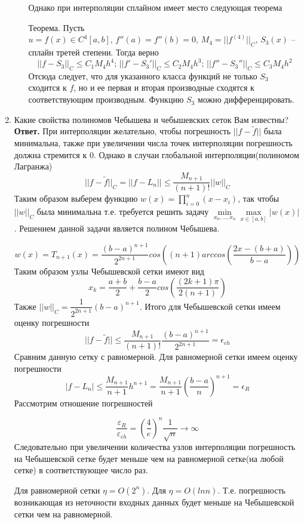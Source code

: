 \documentclass{article}
\begin{document}
\begin{enumerate}
\begin{enumerate}
            
            Однако при интерполяции сплайном имеет место следующая теорема
            
            
            Теорема. Пусть $u=f(x)\in C^4[a,b],\, f''(a)=f''(b)=0, \, M_4 = ||f^(4)||_C, \, S_3(x)$ -- сплайн третей степени. Тогда верно 
            \[
            ||f-S_3||_C \le C_1 M_4 h^4; \, ||f'-S_3'||_C \le C_2 M_4 h^3; \, ||f''-S_3''||_C \le C_3 M_4 h^2
            \]
            Отсюда следует, что для указанного класса функций не
            только $S_3$ сходится к $f$, но и ее первая и вторая производные сходятся к соответствующим производным. Функцию $S_3$ можно дифференцировать.
        \end{enumerate}
        
	
	
        \item Какие свойства полиномов Чебышева и чебышевских сеток Вам известны?
        \newline 
        {\bfseries Ответ. } 
        При интерполяции желательно, чтобы погрешность $||f-\widetilde{f}||$ была минимальна, также при увеличении числа точек интерполяции погрешность должна стремится к 0. Однако в случаи глобальной интерполяции(полиномом Лагранжа) 
	\[
	||f-\widetilde{f}||_C=||f-L_n|| \le \frac{M_{n+1}}{(n+1)!}||w||_C
	\]
	Таким образом выберем функцию $w(x) = \prod_{i=0}^{n}(x-x_i)$, так чтобы $||w||_C$ была минимальна т.е. требуется решить задачу $\min \limits_{x_0,\ldots ,x_n} \max \limits_{x\in [a,b]} |w(x)|$. Решением данной задачи является полином Чебышева.
	
	\[
	w(x)=T_{n+1}(x)=\frac{(b-a)^{n+1}}{2^{2n+1}} cos((n+1)arccos(\frac{2x-(b+a)}{b-a}))
	\]
	Таким образом узлы Чебышевской сетки имеют вид
	\[
	x_k=\frac{a+b}{2}+\frac{b-a}{2}cos(\frac{(2k+1)\pi}{2(n+1)})
	\]
	Также $||w||_C=\dfrac{1}{2^{2n+1}}(b-a)^{n+1}$. Итого для Чебышевской сетки имеем оценку погрешности
	\[
	||f-\widetilde{f}||\le \frac{M_{n+1}}{(n+1)!}\frac{(b-a)^{n+1}}{2^{2n+1}} = \epsilon_{ch}
	\]
	Сравним данную сетку с равномерной. Для равномерной сетки имеем оценку погрешности
	\[
	|f-L_n|\le \frac{M_{n+1}}{n+1}h^{n+1} = \frac{M_{n+1}}{n+1}(\frac{b-a}{n})^{n+1} = \epsilon_{R}
	\]
	Рассмотрим отношение погрешностей

	\[
	\frac{\varepsilon_{R}}{\varepsilon_{ch}} = (\frac{4}{e})^n \frac{1}{\sqrt{n}} \rightarrow \infty
	\]
	Следовательно при увеличении количества узлов интерполяции погрешность на Чебышевской сетке будет меньше чем на равномерной сетке(на любой сетке) в соответствующее число раз.
	
	
	\noindent 
	Для равномерной сетки $\eta=O(2^n)$. Для $\eta = O(lnn)$. Т.е. погрешность возникающая из неточности входных данных будет меньше на Чебышевской сетки чем на равномерной.
    \end{enumerate}    
\end{document}
